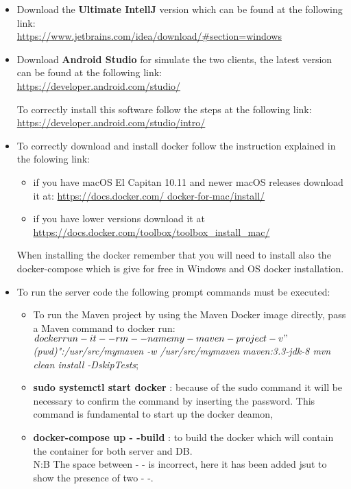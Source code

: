 \begin{itemize}
	\item Download the \textbf{Ultimate IntellJ} version which can be found at the following link:\\
 		\url{https://www.jetbrains.com/idea/download/#section=windows}

	\item Download \textbf{Android Studio} for simulate the two clients, the latest version can be found at the following link:\\
		\url{https://developer.android.com/studio/}

		To correctly install this software follow the steps at the following link:\\
		\url{https://developer.android.com/studio/intro/}

	\item To correctly download and install docker follow the instruction explained in the folowing link:\\
		\begin{itemize}
		\item if you have macOS El Capitan 10.11 and newer macOS releases  download it at: \url{https://docs.docker.com/				docker-for-mac/install/}\\
		\item if you have lower versions download it at \url{https://docs.docker.com/toolbox/toolbox_install_mac/}
		\end{itemize}
	When installing the docker remember that you will need to install also the docker-compose which is give for free in Windows 			and OS docker installation.


	\item To run the server code the following prompt commands must be executed:\\
	
		\begin{itemize}
			\item To run the  Maven project by using the Maven Docker image directly, pass a Maven command to docker 					run:\\
\textit{$ docker run -it --rm --name my-maven-project -v "$(pwd)":/usr/src/mymaven -w /usr/src/mymaven maven:3.3-jdk-8 mvn clean install -DskipTests};
			\item \textbf{ sudo systemctl start docker} : because of the sudo command it will be necessary to confirm the 					command by inserting the password. This command is fundamental to start up the docker deamon,	
			\item \textbf{ docker-compose up - -build} : to build the docker which will contain the container for both server 					and DB.\\N:B The space between - - is incorrect, here it has been added jsut to show the presence of two - -.
		\end{itemize}


\end{itemize}
